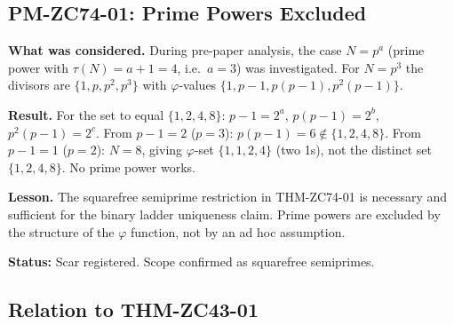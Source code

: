 \documentclass[12pt, a4paper]{article}
\begin{document}
\subsection{PM-ZC74-01: Prime Powers Excluded}
\label{sec:pm}

\begin{derivedbox}[title={PM-ZC74-01: Prime Power Case $N = p^3$
  Excluded --- Scope Restriction (Failure Stance)}]

\textbf{What was considered.}
During pre-paper analysis, the case $N = p^a$ (prime power with
$\tau(N) = a+1 = 4$, i.e.\ $a = 3$) was investigated.
For $N = p^3$ the divisors are $\{1, p, p^2, p^3\}$ with
$\varphi$-values $\{1, p-1, p(p-1), p^2(p-1)\}$.

\textbf{Result.}
For the set to equal $\{1, 2, 4, 8\}$:
$p - 1 = 2^a$, $p(p-1) = 2^b$, $p^2(p-1) = 2^c$.
From $p-1 = 2$ ($p=3$): $p(p-1) = 6 \notin \{1,2,4,8\}$.
From $p-1 = 1$ ($p=2$): $N = 8$, giving $\varphi$-set
$\{1, 1, 2, 4\}$ (two 1s), not the distinct set $\{1,2,4,8\}$.
No prime power works.

\textbf{Lesson.}
The squarefree semiprime restriction in THM-ZC74-01 is necessary
and sufficient for the binary ladder uniqueness claim.
Prime powers are excluded by the structure of the $\varphi$ function,
not by an ad hoc assumption.

\textbf{Status:} Scar registered. Scope confirmed as squarefree semiprimes.
\end{derivedbox}

\subsection{Relation to THM-ZC43-01}
\label{sec:relation}
\end{document}
